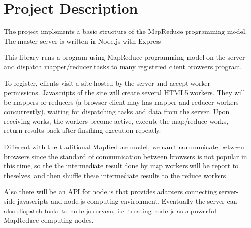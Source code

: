 \section{Project Description}

The project implements a basic structure of the MapReduce programming model. The master server is written in Node.js with Express

This library runs a program using MapReduce programming model on the server and dispatch mapper/reducer tasks to many registered client browsers program.

To register, clients visit a site hosted by the server and accept worker permissions. Javascripts of the site will create several HTML5 workers. They will be mappers or reducers (a browser client may has mapper and reducer workers concurrently), waiting for dispatching tasks and data from the server. Upon receiving works, the workers become active, execute the map/reduce works, return results back after finsihing execution repeatly.

Different with the traditional MapReduce model, we can’t communicate between browsers since the standard of communication between browsers is not popular in this time, so the the intermediate result done by map workers will be report to theselves, and then shuffle these intermediate results to the reduce workers.

Also there will be an API for node.js that provides adapters connecting server-side javascripts and node.js computing environment. Eventually the server can also dispatch tasks to node.js servers, i.e. treating node.js as a powerful MapReduce computing nodes.